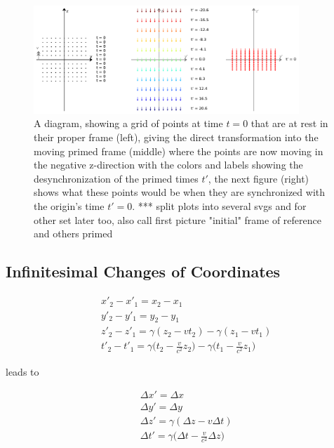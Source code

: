 \begin{figure}[H]
	\centering
	\includegraphics[width=10cm]{images/pdf/coordinate_transforms.pdf}
	\caption{A diagram, showing a grid of points at time $t=0$ that are at rest in their proper frame (left), giving the direct transformation into the moving primed frame (middle) where the points are now moving in the negative z-direction with the colors and labels showing the desynchronization of the primed times $t{'}$, the next figure (right) shows what these points would be when they are synchronized with the origin's time $t{'}=0$. *** split plots into several svgs and for other set later too, also call first picture "initial" frame of reference and others primed}
	\label{fig: coordinate transform}
\end{figure}

\subsection{Infinitesimal Changes of Coordinates}

\begin{equation}
	\begin{aligned}
		 & x{'}_2 - x{'}_1 = x_2 - x_1                                                                                   \\
		 & y{'}_2 - y{'}_1 = y_2 - y_1                                                                                   \\
		 & z{'}_2 - z{'}_1 = {\gamma} ( z_2 - v {t}_2) - {\gamma} ( z_1 - v {t}_1)                                           \\
		 & t{'}_2 - t{'}_1={\gamma} \bigg( {t}_2-\frac{v}{c^2} z_2 \bigg) - {\gamma} \bigg( {t}_1 - \frac{v}{c^2} z_1 \bigg)
	\end{aligned}
\end{equation}

leads to

\begin{equation}
	\label{eq: interval of Coordinates}
	\begin{aligned}
		 & \Delta x{'}= \Delta x                                              \\
		 & \Delta y{'}= \Delta y                                              \\
		 & \Delta z{'} = {\gamma} ( \Delta z-v \Delta t)                      \\
		 & \Delta t{'}={\gamma} \bigg( \Delta t-\frac{v}{c^2} \Delta z \bigg)
	\end{aligned}
\end{equation}

